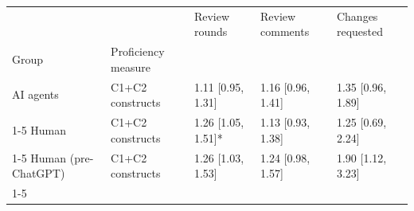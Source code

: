 \begin{tabular}{lllll}
\toprule
 &  & Review rounds & Review comments & Changes requested \\
Group & Proficiency measure &  &  &  \\
\midrule
AI agents & C1+C2 constructs & 1.11 [0.95, 1.31] & 1.16 [0.96, 1.41] & 1.35 [0.96, 1.89] \\
\cline{1-5}
Human & C1+C2 constructs & 1.26 [1.05, 1.51]* & 1.13 [0.93, 1.38] & 1.25 [0.69, 2.24] \\
\cline{1-5}
Human (pre-ChatGPT) & C1+C2 constructs & 1.26 [1.03, 1.53] & 1.24 [0.98, 1.57] & 1.90 [1.12, 3.23] \\
\cline{1-5}
\bottomrule
\end{tabular}
